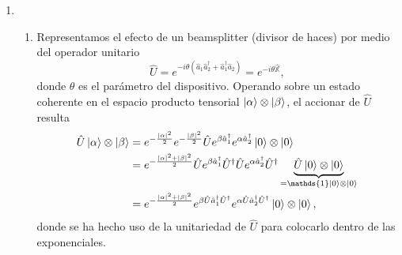 \documentclass{scrartcl}
\renewcommand{\a}{\hat{a}}
\DeclareRobustCommand{\[}{\begin{equation}}
\DeclareRobustCommand{\]}{\end{equation}}
\begin{document}
\begin{enumerate}
\begin{enumerate}
    \end{enumerate}
    
    
    
    \item \begin{enumerate}
        \item Representamos el efecto de un beamsplitter (divisor de haces) por medio del operador unitario
        \[ \hat U = e^{-i\theta (\a_1 \a_2^\dagger + \a_1^\dagger \a_2)} = e^{-i\theta \hat{\mathbb{X}}}, \]
        donde $\theta$ es el parámetro del dispositivo. Operando sobre un estado coherente en el espacio producto tensorial $\ket{\alpha} \otimes \ket{\beta}$, el accionar de $\hat U$ resulta
        \begin{align}
            \hat U \ket{\alpha} \otimes \ket{\beta} &= e^{-\frac{\abs{\alpha}^2}{2}} e^{-\frac{\abs{\beta}^2}{2}} \hat U e^{\beta \a_1^\dagger} e^{\alpha \a_2^\dagger} \ket{0} \otimes \ket{0} \\
                &= e^{-\frac{\abs{\alpha}^2 + \abs{\beta}^2}{2}} \hat U e^{\beta \a_1^\dagger} \hat U^\dagger \hat U e^{\alpha \a_2^\dagger} \hat U^\dagger \underbrace{\hat U \ket{0} \otimes \ket{0}}_{= \mathds{1} \ket{0} \otimes \ket{0}} \\
                &= e^{-\frac{\abs{\alpha}^2 + \abs{\beta}^2}{2}} e^{\beta \hat U \a_1^\dagger \hat U^\dagger} e^{\alpha \hat U \a_2^\dagger \hat U^\dagger} \ket{0} \otimes \ket{0}, \label{eq:I_2_a_1}
        \end{align}
        donde se ha hecho uso de la unitariedad de $\hat U$ para colocarlo dentro de las exponenciales.
        

\end{enumerate}
\end{enumerate}
\end{document}
